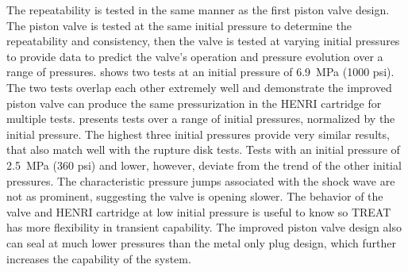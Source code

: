 


The repeatability is tested in the same manner as the first piston valve design. The piston valve is tested at the same initial pressure to determine the repeatability and consistency, then the valve is tested at varying initial pressures to provide data to predict the valve's operation and pressure evolution over a range of pressures.  shows two tests at an initial pressure of \SI{6.9}{\mega\pascal} (1000 psi). The two tests overlap each other extremely well and demonstrate the improved piston valve can produce the same pressurization in the HENRI cartridge for multiple tests.  presents tests over a range of initial pressures, normalized by the initial pressure. The highest three initial pressures provide very similar results, that also match well with the rupture disk tests. Tests with an initial pressure of \SI{2.5}{\mega\pascal} (360 psi) and lower, however, deviate from the trend of the other initial pressures. The characteristic pressure jumps associated with the shock wave are not as prominent, suggesting the valve is opening slower. The behavior of the valve and HENRI cartridge at low initial pressure is useful to know so TREAT has more flexibility in transient capability. The improved piston valve design also can seal at much lower pressures than the metal only plug design, which further increases the capability of the system.




